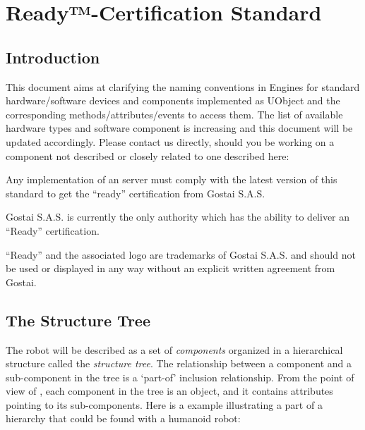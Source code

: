 \newenvironment{slots}
{%
  \begin{flushleft}%
    \tablehead{}%
    \begin{supertabular}{|m{2.8669999cm}|m{12.472cm}|}%
      \hline%
      \textbf{Slot} &%
      \textbf{Description}\\\hline%
    }
    {%
    \end{supertabular}%
  \end{flushleft}%
}

\chapter{\urbi Ready™-Certification Standard}

\section{Introduction}

This document aims at clarifying the naming conventions
in \urbi Engines for standard hardware/software devices and components
implemented as UObject and the corresponding
methods/attributes/events to access them. The list of available
hardware types and software component is increasing and this document
will be updated accordingly. Please contact us directly, should you be
working on a component not described or closely related to one
described here:

\begin{center}
\end{center}

Any implementation of an \urbi server must comply with the latest version
of this standard to get the ``\urbi ready''
certification from Gostai S.A.S.


Gostai S.A.S. is currently the only authority which has the ability to
deliver an ``\urbi Ready'' certification.

{
“\urbi Ready” and the associated logo are trademarks of Gostai S.A.S. and
should not be used or displayed in any way without an explicit written
agreement from Gostai.}

\section{The Structure Tree}

The robot will be described as a set of
\textit{components} organized in a hierarchical
structure called the \textit{structure tree}. The
relationship between a component and a sub-component in the tree is a
‘part-of’ inclusion relationship. From the point of view of \urbi, each
component in the tree is an object, and it contains attributes pointing
to its sub-components. Here is a example illustrating a part of a
hierarchy that could be found with a humanoid robot:



